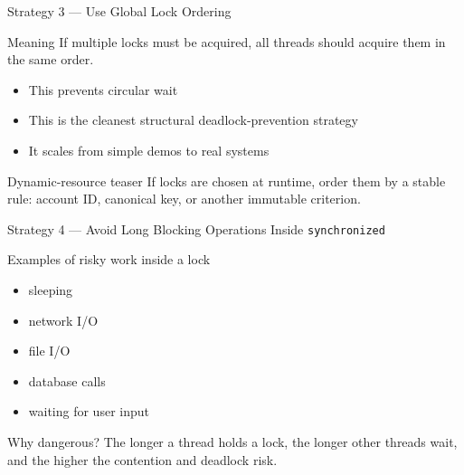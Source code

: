 \documentclass[aspectratio=169,11pt]{beamer}
\begin{document}
	\begin{frame}{Strategy 3 --- Use Global Lock Ordering}
		\begin{block}{Meaning}
			If multiple locks must be acquired, all threads should acquire them in the same order.
		\end{block}
		
		\bigskip
		
		\begin{itemize}
			\item This prevents circular wait
			\item This is the cleanest structural deadlock-prevention strategy
			\item It scales from simple demos to real systems
		\end{itemize}
		
		\bigskip
		
		\begin{alertblock}{Dynamic-resource teaser}
			If locks are chosen at runtime, order them by a stable rule:
			account ID, canonical key, or another immutable criterion.
		\end{alertblock}
	\end{frame}
	
	\begin{frame}{Strategy 4 --- Avoid Long Blocking Operations Inside \texttt{synchronized}}
		\begin{block}{Examples of risky work inside a lock}
			\begin{itemize}
				\item sleeping
				\item network I/O
				\item file I/O
				\item database calls
				\item waiting for user input
			\end{itemize}
		\end{block}
		
		\bigskip
		
		\begin{alertblock}{Why dangerous?}
			The longer a thread holds a lock, the longer other threads wait,
			and the higher the contention and deadlock risk.
		\end{alertblock}
	\end{frame}
	
\end{document}
